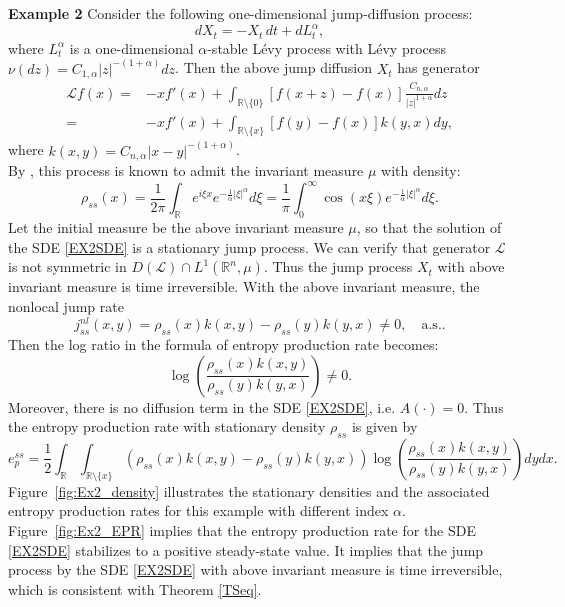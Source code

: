 \documentclass[10pt]{article}
\theoremstyle{definition}
\theoremstyle{remark}
\numberwithin{equation}{section}
\begin{document}
\noindent\textbf{Example 2}
Consider the following one-dimensional jump-diffusion process:
\begin{equation}\label{EX2SDE}
dX_t = -X_t\,dt + dL^{\alpha}_t,
\end{equation}
where $L^{\alpha}_t$ is a one-dimensional $\alpha$-stable Lévy process with Lévy process $\nu(dz) = C_{1,\alpha}|z|^{-(1+\alpha)}dz$. 
Then the above jump diffusion $X_t$ has generator
\begin{align*}
  \mathcal{L}f(x) = & -x f'(x) + \int_{\mathbb{R}\setminus\{0\}} [f(x+z) - f(x)]\frac{C_{n,\alpha}}{|z|^{1+\alpha}}dz \\
  = & -x f'(x) + \int_{\mathbb{R} \setminus \{x\}} [f(y) - f(x)] k(y,x)dy,
\end{align*}
where $k(x,y) = C_{n,\alpha}|x-y|^{-(1+\alpha)}$.\\
By \cite[Proposition 3.2]{ARW00}, this process is known to admit the invariant measure $\mu$ with density:
\begin{equation}
\rho_{ss}(x) = \frac{1}{2\pi} \int_{\mathbb{R}} e^{i\xi x} e^{-\frac{1}{\alpha}|\xi|^{\alpha}}d\xi = \frac{1}{\pi} \int^{\infty}_0 \cos (x\xi) e^{-\frac{1}{\alpha}|\xi|^{\alpha}}d\xi.
\end{equation}
Let the initial measure be the above invariant measure $\mu$, so that the solution of the SDE \eqref{EX2SDE} is a stationary jump process.
We can verify that generator $\mathcal{L}$ is not symmetric in $D(\mathcal{L}) \cap L^1(\mathbb{R}^n, \mu)$. Thus the jump process $X_t$ with above invariant measure is time irreversible. With the above invariant measure, the nonlocal jump rate
\begin{equation*}
    j^{nl}_{ss}(x,y) = \rho_{ss}(x)k(x, y) - \rho_{ss}(y)k(y,x) \neq 0, \quad \text{a.s.}.
\end{equation*}
Then the log ratio in the formula of entropy production rate becomes:
$$ \log \left( \frac{\rho_{ss}(x)k(x, y)}{\rho_{ss}(y)k(y,x)} \right) \neq 0. $$
Moreover, there is no diffusion term in the SDE \eqref{EX2SDE}, i.e. $A(\cdot) = 0$. Thus the entropy production rate with stationary density $\rho_{ss}$ is given by
\begin{equation}
e^{ss}_p = \frac{1}{2} \int_{\mathbb{R}} \int_{\mathbb{R}\setminus\{x\}} (\rho_{ss}(x)k(x, y) - \rho_{ss}(y)k(y,x)) \log \left( \frac{\rho_{ss}(x)k(x, y)}{\rho_{ss}(y)k(y,x)} \right)dydx.
\end{equation}
Figure~\ref{fig:Ex2_density} illustrates the stationary densities and the associated entropy production rates for this example with different index $\alpha$. Figure~\ref{fig:Ex2_EPR} implies that the entropy production rate for the SDE \eqref{EX2SDE} stabilizes to a positive steady-state value. 
It implies that the jump process by the SDE \eqref{EX2SDE} with above invariant measure is time irreversible, which is consistent with Theorem \ref{TSeq}.
\end{document}
